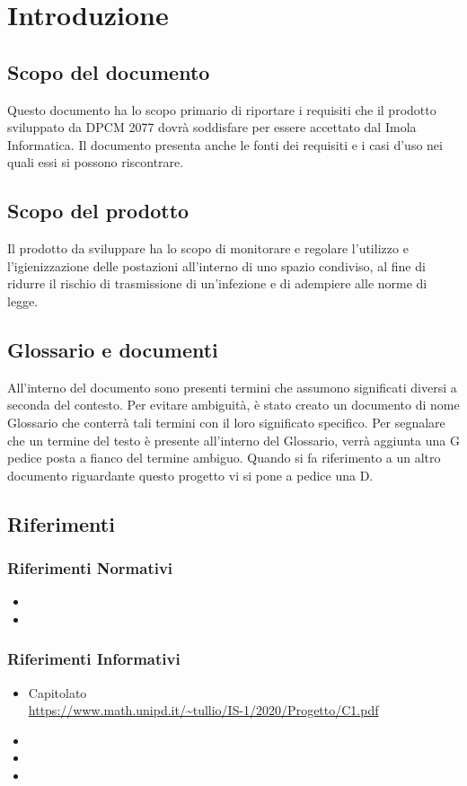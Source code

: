\section{Introduzione}

\subsection{Scopo del documento}
Questo documento ha lo scopo primario di riportare i requisiti che il prodotto sviluppato da DPCM 2077 dovrà soddisfare per essere accettato dal  Imola Informatica.
Il documento presenta anche le fonti dei requisiti e i casi d'uso nei quali essi si possono riscontrare.
\subsection{Scopo del prodotto}
Il prodotto da sviluppare ha lo scopo di monitorare e regolare l'utilizzo e l'igienizzazione delle postazioni all'interno di uno spazio condiviso, al fine di ridurre il rischio di trasmissione di un'infezione e di adempiere alle norme di legge. 
\subsection{Glossario e documenti} 
All'interno del  documento sono presenti termini che assumono significati diversi a seconda del contesto.
Per evitare ambiguità, è stato creato un  documento di nome Glossario che  conterrà tali termini con il loro significato specifico. Per segnalare che un termine del testo è presente all'interno del Glossario, verrà aggiunta una G pedice posta a fianco del termine ambiguo.
Quando si fa riferimento a un altro documento riguardante questo progetto vi si pone a pedice una D.
\subsection{Riferimenti}
\subsubsection{Riferimenti Normativi}
\begin{itemize}
	\item {}
	\item {}
\end{itemize}

\subsubsection{Riferimenti Informativi}
\begin{itemize}
	\item{Capitolato \\
		\url{https://www.math.unipd.it/~tullio/IS-1/2020/Progetto/C1.pdf}}
	\item {}
	\item {}
	\item {}
\end{itemize}